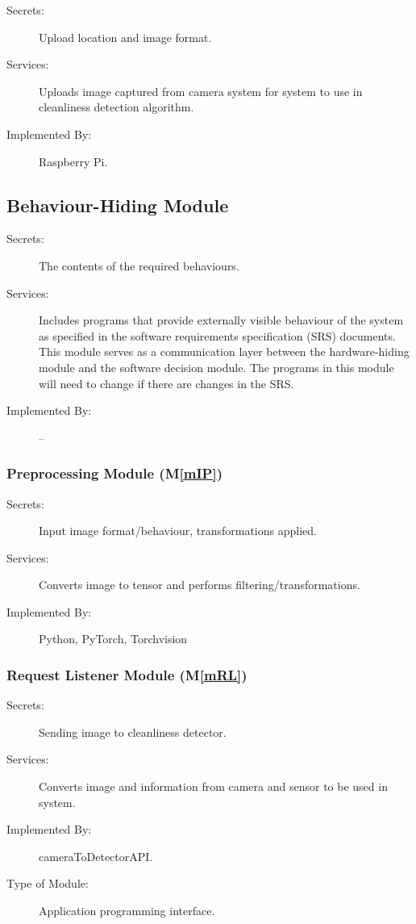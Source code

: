 \documentclass[12pt, titlepage]{article}
\newcommand{\mref}[1]{M\ref{#1}}
\begin{document}
\begin{description}
\item[Secrets:] Upload location and image format.
\item[Services:] Uploads image captured from camera system for system to use in cleanliness detection algorithm.
\item[Implemented By:] Raspberry Pi.
\end{description}

\subsection{Behaviour-Hiding Module}

\begin{description}
\item[Secrets:]The contents of the required behaviours.
\item[Services:]Includes programs that provide externally visible behaviour of
  the system as specified in the software requirements specification (SRS)
  documents. This module serves as a communication layer between the
  hardware-hiding module and the software decision module. The programs in this
  module will need to change if there are changes in the SRS.
\item[Implemented By:] --
\end{description}


\subsubsection{Preprocessing Module (\mref{mIP})}

\begin{description}
\item[Secrets:]Input image format/behaviour, transformations applied.
\item[Services:]Converts image to tensor and performs filtering/transformations. 
\item[Implemented By:]Python, PyTorch, Torchvision
\end{description}

\subsubsection{Request Listener Module (\mref{mRL})}

\begin{description}
\item[Secrets:] Sending image to cleanliness detector.
\item[Services:] Converts image and information from camera and sensor to be used in system.
\item[Implemented By:] cameraToDetectorAPI.
\item[Type of Module:] Application programming interface.
\end{description}
\end{document}
